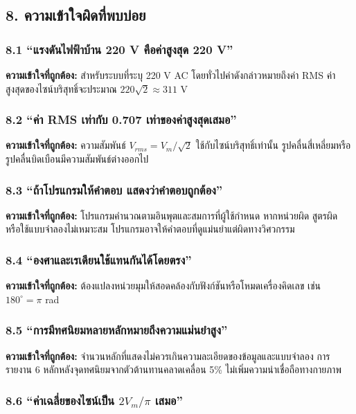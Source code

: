  

\subsection{8. ความเข้าใจผิดที่พบบ่อย}

\subsubsection{8.1 “แรงดันไฟฟ้าบ้าน 220 V คือค่าสูงสุด 220 V”}

\textbf{ความเข้าใจที่ถูกต้อง:} สำหรับระบบที่ระบุ 220 V AC โดยทั่วไปค่าดังกล่าวหมายถึงค่า RMS ค่าสูงสุดของไซน์บริสุทธิ์จะประมาณ $220\sqrt{2}\approx311$ V

\subsubsection{8.2 “ค่า RMS เท่ากับ 0.707 เท่าของค่าสูงสุดเสมอ”}

\textbf{ความเข้าใจที่ถูกต้อง:} ความสัมพันธ์ $V_{rms}=V_m/\sqrt{2}$ ใช้กับไซน์บริสุทธิ์เท่านั้น รูปคลื่นสี่เหลี่ยมหรือรูปคลื่นบิดเบือนมีความสัมพันธ์ต่างออกไป

\subsubsection{8.3 “ถ้าโปรแกรมให้คำตอบ แสดงว่าคำตอบถูกต้อง”}

\textbf{ความเข้าใจที่ถูกต้อง:} โปรแกรมคำนวณตามอินพุตและสมการที่ผู้ใช้กำหนด หากหน่วยผิด สูตรผิด หรือใช้แบบจำลองไม่เหมาะสม โปรแกรมอาจให้คำตอบที่ดูแม่นยำแต่ผิดทางวิศวกรรม

\subsubsection{8.4 “องศาและเรเดียนใช้แทนกันได้โดยตรง”}

\textbf{ความเข้าใจที่ถูกต้อง:} ต้องแปลงหน่วยมุมให้สอดคล้องกับฟังก์ชันหรือโหมดเครื่องคิดเลข เช่น $180^\circ=\pi$ rad

\subsubsection{8.5 “การมีทศนิยมหลายหลักหมายถึงความแม่นยำสูง”}

\textbf{ความเข้าใจที่ถูกต้อง:} จำนวนหลักที่แสดงไม่ควรเกินความละเอียดของข้อมูลและแบบจำลอง การรายงาน 6 หลักหลังจุดทศนิยมจากตัวต้านทานคลาดเคลื่อน 5\% ไม่เพิ่มความน่าเชื่อถือทางกายภาพ

\subsubsection{8.6 “ค่าเฉลี่ยของไซน์เป็น $2V_m/\pi$ เสมอ”}

